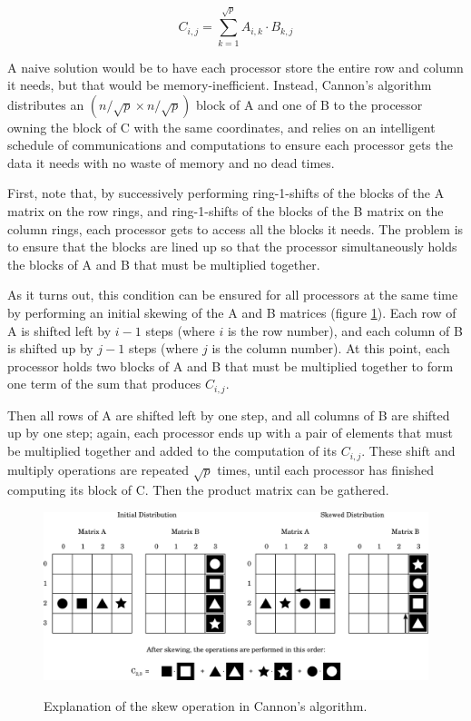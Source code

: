 \documentclass{article}
\begin{document}
$$C_{i,j} = \sum\limits_{k=1}^{\sqrt{p}} A_{i,k} \cdot B_{k,j}$$

A naive solution would be to have each processor store the entire row and column it needs, but that would be memory-inefficient. Instead, Cannon's algorithm distributes an $(n/\sqrt{p} \times n/\sqrt{p})$ block of A and one of B to the processor owning the block of C with the same coordinates, and relies on an intelligent schedule of communications and computations to ensure each processor gets the data it needs with no waste of memory and no dead times.

First, note that, by successively performing ring-1-shifts of the blocks of the A matrix on the row rings, and ring-1-shifts of the blocks of the  B matrix on the column rings, each processor gets to access all the blocks it needs. The problem is to ensure that the blocks are lined up so that the processor simultaneously holds the blocks of A and B that must be multiplied together.

As it turns out, this condition can be ensured for all processors at the same time by performing an initial skewing of the A and B matrices (figure \ref{fig:cannon-skew}). Each row of A is shifted left by $i-1$ steps (where $i$ is the row number), and each column of B is shifted up by $j-1$ steps (where $j$ is the column number). At this point, each processor holds two blocks of A and B that must be multiplied together to form one term of the sum that produces $C_{i,j}$.

Then all rows of A are shifted left by one step, and all columns of B are shifted up by one step; again, each processor ends up with a pair of elements that must be multiplied together and added to the computation of its $C_{i,j}$. These shift and multiply operations are repeated $\sqrt{p}$ times, until each processor has finished computing its block of C. Then the product matrix can be gathered.


\begin{figure}
	\centering
	\includegraphics[width=1.0\textwidth]{images/cannon-skew.pdf}
    \label{fig:cannon-skew}
    \caption{Explanation of the skew operation in Cannon's algorithm.}
\end{figure}
\end{document}
